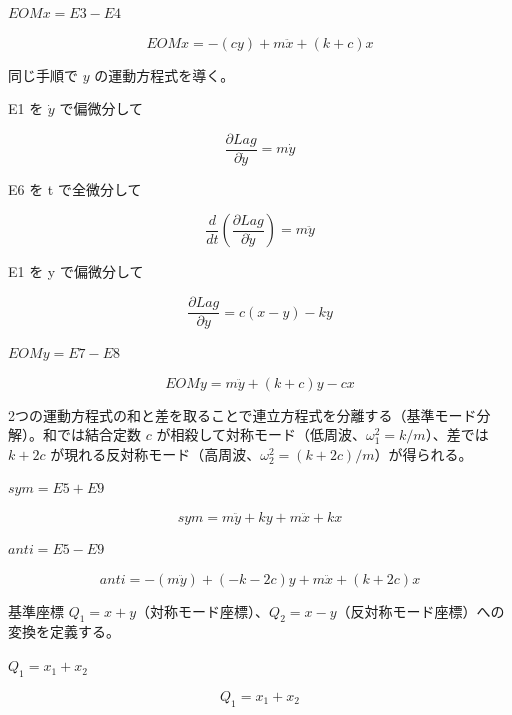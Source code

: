 \documentclass[dvipdfmx,a4paper,11pt]{jsarticle}
\begin{document}
$EOMx = E3 - E4$

\begin{equation}
  EOMx = -\left(c y\right)+m \ddot{x}+\left(k+c\right) x
  \label{eq:E5}
\end{equation}

同じ手順で $y$ の運動方程式を導く。

E1 を $\dot{y}$ で偏微分して

\begin{equation}
  \frac{\partial Lag}{\partial \dot{y}} = m \dot{y}
  \label{eq:E6}
\end{equation}

E6 を t で全微分して

\begin{equation}
  \frac{d}{dt}\left(\frac{\partial Lag}{\partial \dot{y}}\right) = m \ddot{y}
  \label{eq:E7}
\end{equation}

E1 を y で偏微分して

\begin{equation}
  \frac{\partial Lag}{\partial y} = c \left(x-y\right)-k y
  \label{eq:E8}
\end{equation}

$EOMy = E7 - E8$

\begin{equation}
  EOMy = m \ddot{y}+\left(k+c\right) y-c x
  \label{eq:E9}
\end{equation}

2つの運動方程式の和と差を取ることで連立方程式を分離する（基準モード分解）。和では結合定数 $c$ が相殺して対称モード（低周波、$\omega_1^2=k/m$）、差では $k+2c$ が現れる反対称モード（高周波、$\omega_2^2=(k+2c)/m$）が得られる。

$sym = E5 + E9$

\begin{equation}
  sym = m \ddot{y}+k y+m \ddot{x}+k x
  \label{eq:E10}
\end{equation}

$anti = E5 - E9$

\begin{equation}
  anti = -\left(m \ddot{y}\right)+\left(-k-2 c\right) y+m \ddot{x}+\left(k+2 c\right) x
  \label{eq:E11}
\end{equation}

基準座標 $Q_1=x+y$（対称モード座標）、$Q_2=x-y$（反対称モード座標）への変換を定義する。

$Q_1 = x_1 + x_2$

\begin{equation}
  Q_1 = x_1 + x_2
  \label{eq:E12}
\end{equation}
\end{document}
